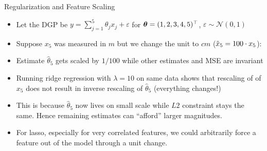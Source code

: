 \documentclass[11pt,compress,t,notes=noshow, xcolor=table]{beamer}
\begin{document}
\begin{vbframe}{Regularization and Feature Scaling}
\footnotesize{
\begin{itemize}
    \item Let the DGP be $y = \sum_{j=1}^{5} \theta_j x_{j} +\varepsilon$ for $\bm{\theta}=(1,2,3,4,5)^\top$, $\varepsilon \sim \mathcal{N}(0,1)$ %
    \item Suppose $x_5$ was measured in $m$ but we change the unit to $cm$ ($\Tilde{x}_5=100 \cdot x_5$):
\end{itemize}
\vspace{-0.4cm}
\begin{table}[h]
\centering

\end{table}
\vspace{-0.1cm}
\begin{itemize}
    \item Estimate $\hat{\theta}_5$ gets scaled by $1/100$ while other estimates and MSE are invariant
    \item Running ridge regression with $\lambda=10$ on same data shows that rescaling of of $x_5$ does not result in inverse rescaling of $\hat{\theta}_5$ (everything changes!)
    \item This is because $\hat{\theta}_5$ now lives on small scale while $L2$ constraint stays the same. Hence remaining estimates can ``afford'' larger magnitudes.
\end{itemize}
\vspace{-0.4cm}
\begin{table}[h]
\centering

\end{table}
}

\begin{itemize}
    \item For lasso, especially for very correlated features, we could arbitrarily force a feature out of the model through a unit change.
\end{itemize}

\framebreak



\end{vbframe}
\end{document}
